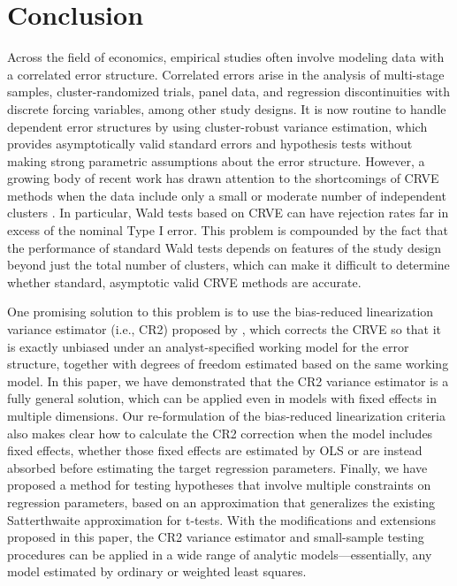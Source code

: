 \documentclass[12pt]{article}\usepackage[]{graphicx}\usepackage[]{color}
\begin{document}
\section{Conclusion}
\label{sec:conclusion}

Across the field of economics, empirical studies often involve modeling data with a correlated error structure. 
Correlated errors arise in the analysis of multi-stage samples, cluster-randomized trials, panel data, and regression discontinuities with discrete forcing variables, among other study designs. 
It is now routine to handle dependent error structures by using cluster-robust variance estimation, which provides asymptotically valid standard errors and hypothesis tests without making strong parametric assumptions about the error structure. 
However, a growing body of recent work has drawn attention to the shortcomings of CRVE methods when the data include only a small or moderate number of independent clusters \citep{Cameron2008bootstrap, Cameron2015practitioners, Imbens2015robust, Webb2013wild}. 
In particular, Wald tests based on CRVE can have rejection rates far in excess of the nominal Type I error. 
This problem is compounded by the fact that the performance of standard Wald tests depends on features of the study design beyond just the total number of clusters, which can make it difficult to determine whether standard, asymptotic valid CRVE methods are accurate. 


One promising solution to this problem is to use the bias-reduced linearization variance estimator (i.e., CR2) proposed by \citet{Bell2002bias}, which corrects the CRVE so that it is exactly unbiased under an analyst-specified working model for the error structure, together with degrees of freedom estimated based on the same working model.
In this paper, we have demonstrated that the CR2 variance estimator is a fully general solution, which can be applied even in models with fixed effects in multiple dimensions. 
Our re-formulation of the bias-reduced linearization criteria also makes clear how to calculate the CR2 correction when the model includes fixed effects, whether those fixed effects are estimated by OLS or are instead absorbed before estimating the target regression parameters.  
Finally, we have proposed a method for testing hypotheses that involve multiple constraints on regression parameters, based on an approximation that generalizes the existing Satterthwaite approximation for t-tests.  
With the modifications and extensions proposed in this paper, the CR2 variance estimator and small-sample testing procedures can be applied in a wide range of analytic models---essentially, any model estimated by ordinary or weighted least squares. 
\end{document}
